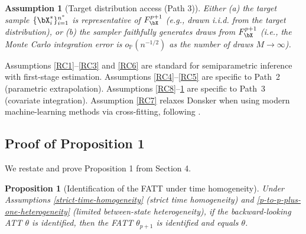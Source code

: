 \documentclass{article}
\newtheorem{assumption}{Assumption}
\newtheorem*{proposition*}{Proposition}
\renewcommand{\P}{\mathbb{P}}
\begin{document}
\begin{assumption}[Target distribution access (Path 3)]\label{RC10}
Either (a) the target sample $\{\bX_i^*\}_{i=1}^{n^*}$ is representative of $F_{\bX}^{p+1}$ (e.g., drawn i.i.d. from the target distribution), or (b) the sampler faithfully generates draws from $F_{\bX}^{p+1}$ (i.e., the Monte Carlo integration error is $o_{\P}(n^{-1/2})$ as the number of draws $M \to \infty$).
\end{assumption}

\begin{remark}
Assumptions \ref{RC1}--\ref{RC3} and \ref{RC6} are standard for semiparametric inference with first-stage estimation. Assumptions \ref{RC4}--\ref{RC5} are specific to Path~2 (parametric extrapolation). Assumptions \ref{RC8}--\ref{RC10} are specific to Path~3 (covariate integration). Assumption \ref{RC7} relaxes Donsker when using modern machine-learning methods via cross-fitting, following \citet{chernozhukovDoubleDebiasedMachine2018}.
\end{remark}

\subsection{Proof of Proposition 1}\label{app:prop1}

We restate and prove Proposition 1 from Section 4.

\begin{proposition*}[Identification of the FATT under time homogeneity]
Under Assumptions \ref{strict-time-homogeneity} (strict time homogeneity) and \ref{p-to-p-plus-one-heterogeneity} (limited between-state heterogeneity), if the backward-looking ATT $\theta$ is identified, then the FATT $\theta_{p+1}$ is identified and equals $\theta$.
\end{proposition*}
\end{document}
